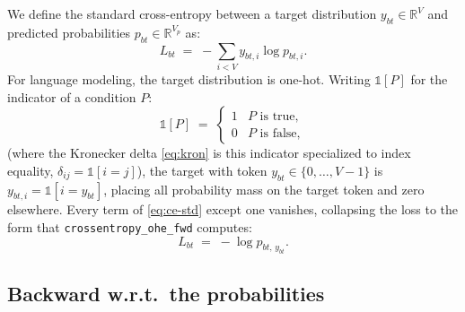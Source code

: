 \documentclass[letterpaper, 10 pt, conference]{ieeeconf}
\newcommand{\R}{\mathbb{R}}
\newcommand{\ind}[1]{\mathbb{1}\!\left[#1\right]}
\newcommand{\kron}[2]{\delta_{#1 #2}}
\theoremstyle{definition}
\begin{document}
We define the standard cross-entropy between a target distribution $y_{bt} \in \R^{V}$ and predicted probabilities $p_{bt} \in \R^{V_p}$ as:
\begin{equation}
  L_{bt} \;=\; -\sum_{i<V} y_{bt,i} \log p_{bt,i}.
  \label{eq:ce-std}
\end{equation}
For language modeling, the target distribution is one-hot. Writing $\ind{P}$ for the indicator of a condition $P$:
\begin{equation}
  \ind{P} \;=\;
  \begin{cases}
    1 & P \text{ is true},  \\
    0 & P \text{ is false},
  \end{cases}
  \label{eq:indicator}
\end{equation}
(where the Kronecker delta \eqref{eq:kron} is this indicator specialized to index equality, $\kron{i}{j} = \ind{i = j}$), the target with token $y_{bt} \in \{0,\dots,V-1\}$ is $y_{bt,i} = \ind{i = y_{bt}}$, placing all probability mass on the target token and zero elsewhere. Every term of \eqref{eq:ce-std} except one vanishes, collapsing the loss to the form that \texttt{crossentropy\_ohe\_fwd} computes:
\begin{equation}
  L_{bt} \;=\; -\log p_{bt,\,y_{bt}}.
  \label{eq:ce-fwd}
\end{equation}

\subsection{Backward w.r.t.\ the probabilities}
\end{document}
